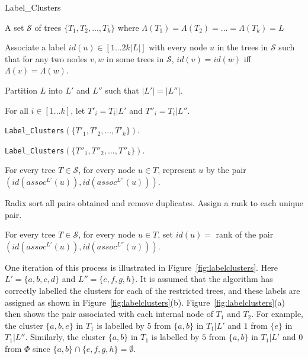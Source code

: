 \documentclass{article}
\newcommand{\leafset}{\Lambda}
\begin{document}
    \begin{algorithm}
        \caption{Label\_Clusters}
        \label{alg:labelclusters}

        \begin{algorithmic}[1]
            \Input A set $\mathcal{S}$ of trees $\{T_1, T_2, ..., T_k\}$ where $\leafset(T_1) = \leafset(T_2) = ... = \leafset(T_k) = L$

            \Output Associate a label $id(u) \in [1 ... 2k |L|]$ with every node $u$ in the trees in $\mathcal{S}$ such that for any two nodes $v, w$ in some trees in $\mathcal{S}$, $id(v) = id(w)$ iff $\leafset(v) = \leafset(w)$.

            \State Partition $L$ into $L'$ and $L''$ such that $|L'| = |L''|$.

            \State For all $i \in [1 ... k]$, let $T'_i = T_i|L'$ and $T''_i = T_i|L''$.

            \State \texttt{Label\_Clusters}$(\{T'_1, T'_2, ..., T'_k\})$.

            \State \texttt{Label\_Clusters}$(\{T''_1, T''_2, ..., T''_k\})$.

            \State For every tree $T \in \mathcal{S}$, for every node $u \in T$, represent $u$ by the pair $(id(assoc^{L'}(u)), id(assoc^{L''}(u)))$.

            \State Radix sort all pairs obtained and remove duplicates. Assign a rank to each unique pair.

            \State For every tree $T \in \mathcal{S}$, for every node $u \in T$, set $id(u) = $ rank of the pair $(id(assoc^{L'}(u)), id(assoc^{L''}(u)))$.
        \end{algorithmic}
    \end{algorithm}

    One iteration of this process is illustrated in Figure~\ref{fig:labelclusters}. Here $L' = \{a, b, c, d\}$ and $L'' = \{e, f, g, h\}$. It is assumed that the algorithm has correctly labelled the clusters for each of the restricted trees, and these labels are assigned as shown in Figure~\ref{fig:labelclusters}(b). Figure~\ref{fig:labelclusters}(a) then shows the pair associated with each internal node of $T_1$ and $T_2$. For example, the cluster $\{a, b, e\}$ in $T_1$ is labelled by $5$ from $\{a, b\}$ in $T_1|L'$ and $1$ from $\{e\}$ in $T_1|L''$. Similarly, the cluster $\{a, b\}$ in $T_1$ is labelled by $5$ from $\{a, b\}$ in $T_1|L'$ and $0$ from $\Phi$ since $\{a, b\} \cap \{e, f, g, h\} = \emptyset$.
\end{document}
